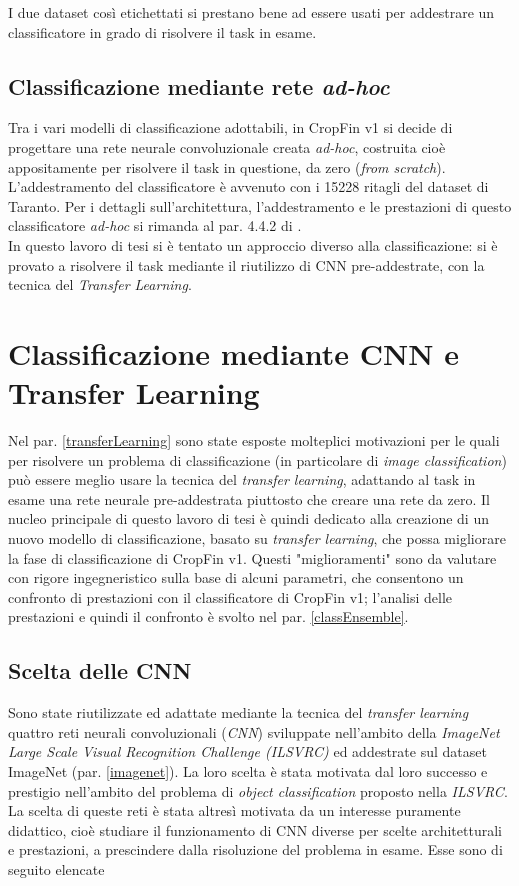 I due dataset così etichettati si prestano bene ad essere usati per addestrare un classificatore in grado di risolvere il task in esame.

\subsection*{Classificazione mediante rete \textit{ad-hoc}}
Tra i vari modelli di classificazione adottabili, in CropFin v1 si decide di progettare una rete neurale convoluzionale creata \textit{ad-hoc}, costruita cioè appositamente per risolvere il task in questione, da zero (\textit{from scratch}). L'addestramento del classificatore è avvenuto con i 15228 ritagli del dataset di Taranto.
Per i dettagli sull'architettura, l'addestramento e le prestazioni di questo classificatore \textit{ad-hoc} si rimanda al par. 4.4.2 di \cite{gianvito}.\\

In questo lavoro di tesi si è tentato un approccio diverso alla classificazione: si è provato a risolvere il task mediante il riutilizzo di CNN pre-addestrate, con la tecnica del \textit{Transfer Learning}.


\section{Classificazione mediante CNN e Transfer Learning}
\label{esperimentoTL}
Nel par. \ref{transferLearning} sono state esposte molteplici motivazioni per le quali per risolvere un problema di classificazione (in particolare di \textit{image classification}) può essere meglio usare la tecnica del \textit{transfer learning}, adattando al task in esame una rete neurale pre-addestrata piuttosto che creare una rete da zero.
Il nucleo principale di questo lavoro di tesi è quindi dedicato alla creazione di un nuovo modello di classificazione, basato su \textit{transfer learning}, che possa migliorare la fase di classificazione di CropFin v1. Questi "miglioramenti" sono da valutare con rigore ingegneristico sulla base di alcuni parametri, che consentono un confronto di prestazioni con il classificatore di CropFin v1; l'analisi delle prestazioni e quindi il confronto è svolto nel par. \ref{classEnsemble}.

\subsection{Scelta delle CNN}
Sono state riutilizzate ed adattate mediante la tecnica del \textit{transfer learning} quattro reti neurali convoluzionali (\textit{CNN}) sviluppate nell'ambito della \textit{ImageNet Large Scale Visual Recognition Challenge (ILSVRC)} ed addestrate sul dataset ImageNet (par. \ref{imagenet}). La loro scelta è stata motivata dal loro successo e prestigio nell'ambito del problema di \textit{object classification} proposto nella \textit{ILSVRC}. La scelta di queste reti è stata altresì motivata da un interesse puramente didattico, cioè studiare il funzionamento di CNN diverse per scelte architetturali e prestazioni, a prescindere dalla risoluzione del problema in esame. Esse sono di seguito elencate

